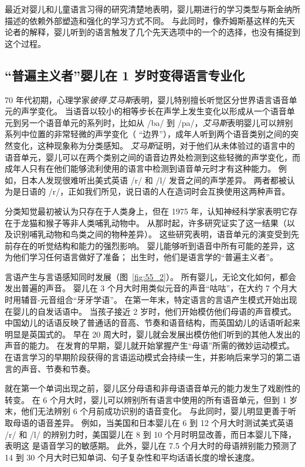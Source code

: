 最近对婴儿和儿童语言习得的研究清楚地表明，婴儿期进行的学习类型与斯金纳所描述的依赖外部塑造和强化的学习方式不同。
与此同时，像乔姆斯基这样的先天论者的解释，婴儿听到的语言触发了几个先天选项中的一个的选择，也没有捕捉到这个过程。



\subsection{“普遍主义者”婴儿在 1 岁时变得语言专业化}

70 年代初期，心理学家\textit{彼得$\cdot$艾马斯}表明，婴儿特别擅长听觉区分世界语言语音单元的声学变化。
当语音以较小的相等步长在声学上发生变化以形成从一个语音单元到另一个语音单元的系列时，比如从 /ba/ 到 /pa/，\textit{艾马斯}表明婴儿可以辨别系列中位置的非常轻微的声学变化（ “边界”），成年人听到两个语音类别之间的突然变化，这种现象称为分类感知。
\textit{艾马斯}证明，对于他们从未体验过的语言中的语音单元，婴儿可以在两个类别之间的语音边界处检测到这些轻微的声学变化，而成年人只有在他们能够流利使用的语言中检测到语音单元时才有这种能力。
例如，日本人发现很难听出美式英语 /r/ 和 /l/ 发音之间的声学差异。
两者都被认为是日语的 /r/，正如我们所见，说日语的人在造词时会互换使用这两种声音。


分类知觉最初被认为只存在于人类身上，但在 1975 年，认知神经科学家表明它存在于龙猫和猴子等非人类哺乳动物中。
从那时起，许多研究证实了这一结果（以及识别哺乳动物和鸟类之间的物种差异）。
这些研究表明，语音单元的演变受到先前存在的听觉结构和能力的强烈影响。
婴儿能够听到语音中所有可能的差异，这为他们学习任何语言做好了准备；
出生时，他们是语言学的“普遍主义者”。


言语产生与言语感知同时发展（图~\ref{fig:55_2}）。
所有婴儿，无论文化如何，都会发出普遍的声音。
婴儿在 3 个月大时用类似元音的声音“咕咕”，在大约 7 个月大时用辅音-元音组合“牙牙学语”。
在第一年末，特定语言的言语产生模式开始出现在婴儿的自发话语中。
当孩子接近 2 岁时，他们开始模仿他们母语的声音模式。
中国幼儿的话语反映了普通话的音高、节奏和语音结构，而英国幼儿的话语听起来明显是英国式的。
早在 20 周大时，婴儿就会发展出模仿他们听到的其他人发出的声音的能力。
在发育的早期，婴儿就开始掌握产生“母语”所需的微妙运动模式。
在语言学习的早期阶段获得的言语运动模式会持续一生，并影响后来学习的第二语言的声音、节奏和节奏。


就在第一个单词出现之前，婴儿区分母语和非母语语音单元的能力发生了戏剧性的转变。
在 6 个月大时，婴儿可以辨别所有语言中使用的所有语音单元，但到 1 岁末，他们无法辨别 6 个月前成功识别的语音变化。
与此同时，婴儿明显更善于听取母语的语音差异。
例如，当美国和日本婴儿在 6 到 12 个月大时测试美式英语 /r/ 和 /l/ 的辨别力时，美国婴儿在 8 到 10 个月时明显改善，而日本婴儿下降，表明这 是语音学习的敏感期。
此外，婴儿在 7.5 个月大时的母语辨别能力预测了 14 到 30 个月大时已知单词、句子复杂性和平均话语长度的增长速度。


